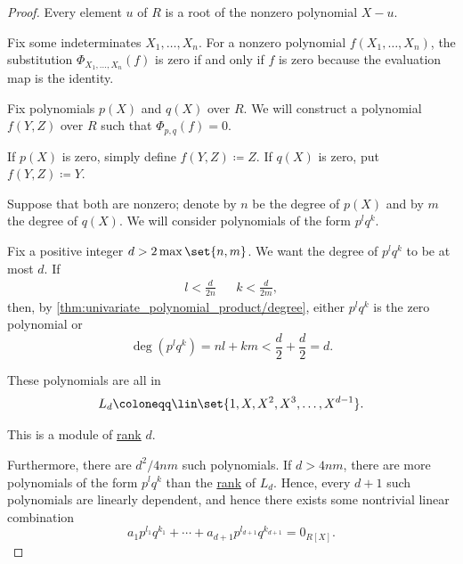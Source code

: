 \begin{proof}
   Every element \( u \) of \( R \) is a root of the nonzero polynomial \( X - u \).

   Fix some indeterminates \( X_1, \ldots, X_n \). For a nonzero polynomial \( f(X_1, \ldots, X_n) \), the substitution \( \Phi_{X_1, \dots, X_n}(f) \) is zero if and only if \( f \) is zero because the evaluation map is the identity.

   Fix polynomials \( p(X) \) and \( q(X) \) over \( R \). We will construct a polynomial \( f(Y, Z) \) over \( R \) such that \( \Phi_{p,q}(f) = 0 \).

  If \( p(X) \) is zero, simply define \( f(Y, Z) \coloneqq Z \). If \( q(X) \) is zero, put \( f(Y, Z) \coloneqq Y \).

  Suppose that both are nonzero; denote by \( n \) be the degree of \( p(X) \) and by \( m \) the degree of \( q(X) \). We will consider polynomials of the form \( p^l q^k \).

  Fix a positive integer \( d > 2 \max\set{ n, m } \). We want the degree of \( p^l q^k \) to be at most \( d \). If
  \begin{align*}
    l < \frac d {2n} && k < \frac d {2m},
  \end{align*}
  then, by \cref{thm:univariate_polynomial_product/degree}, either \( p^l q^k \) is the zero polynomial or
  \begin{equation*}
    \deg(p^l q^k) = nl + km < \frac d 2 + \frac d 2 = d.
  \end{equation*}

  These polynomials are all in
  \begin{equation*}
    L_d \coloneqq \lin\set{ 1, X, X^2, X^3, \ldots, X^{d-1} }.
  \end{equation*}

  This is a module of \hyperref[def:module_rank]{rank} \( d \).

  Furthermore, there are \( d^2 / 4nm \) such polynomials. If \( d > 4nm \), there are more polynomials of the form \( p^l q^k \) than the \hyperref[def:module_rank]{rank} of \( L_d \). Hence, every \( d + 1 \) such polynomials are linearly dependent, and hence there exists some nontrivial linear combination
  \begin{equation*}
    a_1 p^{l_1} q^{k_1} + \cdots + a_{d+1} p^{l_{d+1}} q^{k_{d+1}} = 0_{R[X]}.
  \end{equation*}


\end{proof}
